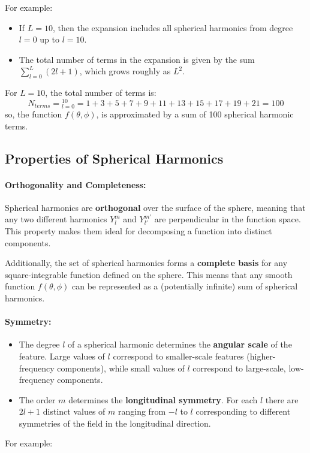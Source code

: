 For example:

\begin{itemize}
	\item If $L=10$, then the expansion includes all spherical harmonics from degree $l=0$ up to $l=10$.
	\item The total number of terms in the expansion is given by the sum $\displaystyle\sum_{l=0}^L(2l+1)$, which grows roughly as $L^2$.
\end{itemize}
For $L=10$, the total number of terms is:
\[
	N_{terms}=\displaystyle_{l=0}^{10}=1+3+5+7+9+11+13+15+17+19+21=100
\]
so, the function $f(\theta,\phi)$, is approximated by a sum of 100 spherical harmonic terms.

\subsection{Properties of Spherical Harmonics}

\paragraph{\textbf{Orthogonality and Completeness}:}

Spherical harmonics are \textbf{orthogonal} over the surface of the sphere, meaning that any two different harmonics $Y_l^m$ and $Y_{l'}^{m'}$ are perpendicular in the function space. This property makes them ideal for decomposing a function into distinct components.

Additionally, the set of spherical harmonics forms a \textbf{complete basis} for any square-integrable function defined on the sphere. This means that any smooth function $f(\theta,\phi)$ can be represented as a (potentially infinite) sum of spherical harmonics.

\paragraph{\textbf{Symmetry}:}

\begin{itemize}
	\item The degree $l$ of a spherical harmonic determines the \textbf{angular scale} of the feature. Large values of $l$ correspond to smaller-scale features (higher-frequency components), while small values of $l$ correspond to large-scale, low-frequency components.
	\item The order $m$ determines the \textbf{longitudinal symmetry}. For each $l$ there are $2l+1$ distinct values of $m$ ranging from $-l$ to $l$ corresponding to different symmetries of the field in the longitudinal direction.
\end{itemize}
For example:

